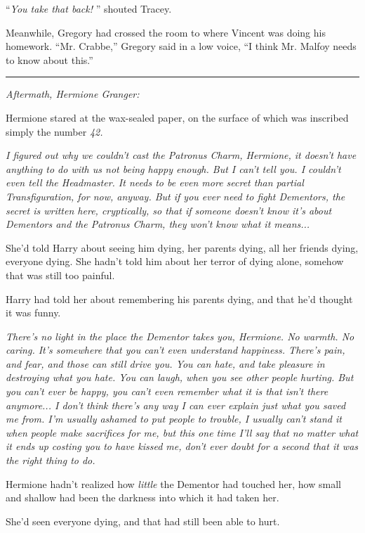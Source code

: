``\emph{You take that back!} '' shouted Tracey.

Meanwhile, Gregory had crossed the room to where Vincent was doing his
homework. ``Mr. Crabbe,'' Gregory said in a low voice, ``I think Mr.
Malfoy needs to know about this.''

\begin{center}\rule{3in}{0.4pt}\end{center}

\emph{Aftermath, Hermione Granger:}

Hermione stared at the wax-sealed paper, on the surface of which was
inscribed simply the number \emph{42.}

\emph{I figured out why we couldn't cast the Patronus Charm, Hermione,
it doesn't have anything to do with us not being happy enough. But I
can't tell you. I couldn't even tell the Headmaster. It needs to be even
more secret than partial Transfiguration, for now, anyway. But if you
ever need to fight Dementors, the secret is written here, cryptically,
so that if someone doesn't know it's about Dementors and the Patronus
Charm, they won't know what it means...}

She'd told Harry about seeing him dying, her parents dying, all her
friends dying, everyone dying. She hadn't told him about her terror of
dying alone, somehow that was still too painful.

Harry had told her about remembering his parents dying, and that he'd
thought it was funny.

\emph{There's no light in the place the Dementor takes you, Hermione. No
warmth. No caring. It's somewhere that you can't even understand
happiness. There's pain, and fear, and those can still drive you. You
can hate, and take pleasure in destroying what you hate. You can laugh,
when you see other people hurting. But you can't ever be happy, you
can't even remember what it is that isn't there anymore... I don't
think there's any way I can ever explain just what you saved me from.
I'm usually ashamed to put people to trouble, I usually can't stand it
when people make sacrifices for me, but this one time I'll say that no
matter what it ends up costing you to have kissed me, don't ever doubt
for a second that it was the right thing to do.}

Hermione hadn't realized how \emph{little} the Dementor had touched her,
how small and shallow had been the darkness into which it had taken her.

She'd seen everyone dying, and that had still been able to hurt.

